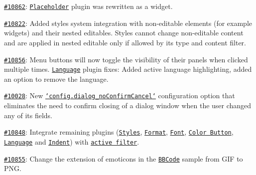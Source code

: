 \begin{DoxyItemize}
\item \href{http://dev.ckeditor.com/ticket/10862}{\tt \#10862}\-: \href{http://ckeditor.com/addon/placeholder}{\tt Placeholder} plugin was rewritten as a widget.
\item \href{http://dev.ckeditor.com/ticket/10822}{\tt \#10822}\-: Added styles system integration with non-\/editable elements (for example widgets) and their nested editables. Styles cannot change non-\/editable content and are applied in nested editable only if allowed by its type and content filter.
\item \href{http://dev.ckeditor.com/ticket/10856}{\tt \#10856}\-: Menu buttons will now toggle the visibility of their panels when clicked multiple times. \href{http://ckeditor.com/addon/language}{\tt Language} plugin fixes\-: Added active language highlighting, added an option to remove the language.
\item \href{http://dev.ckeditor.com/ticket/10028}{\tt \#10028}\-: New \href{http://docs.ckeditor.com/#!/api/CKEDITOR.config-cfg-dialog_noConfirmCancel}{\tt `config.dialog\-\_\-no\-Confirm\-Cancel`} configuration option that eliminates the need to confirm closing of a dialog window when the user changed any of its fields.
\item \href{http://dev.ckeditor.com/ticket/10848}{\tt \#10848}\-: Integrate remaining plugins (\href{http://ckeditor.com/addon/stylescombo}{\tt Styles}, \href{http://ckeditor.com/addon/format}{\tt Format}, \href{http://ckeditor.com/addon/font}{\tt Font}, \href{http://ckeditor.com/addon/colorbutton}{\tt Color Button}, \href{http://ckeditor.com/addon/language}{\tt Language} and \href{http://ckeditor.com/addon/indent}{\tt Indent}) with \href{http://docs.ckeditor.com/#!/api/CKEDITOR.editor-property-activeFilter}{\tt active filter}.
\item \href{http://dev.ckeditor.com/ticket/10855}{\tt \#10855}\-: Change the extension of emoticons in the \href{http://ckeditor.com/addon/bbcode}{\tt B\-B\-Code} sample from G\-I\-F to P\-N\-G.
\end{DoxyItemize}

